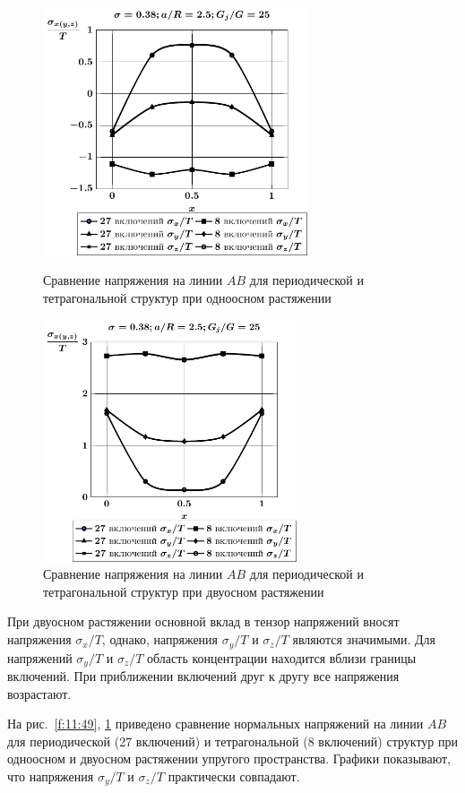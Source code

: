 \begin{figure}[h!]
\centering\footnotesize
\parbox[b]{7.5cm}{\centering\includegraphics[width=7.8cm]{oblate-inc27-8-a25-g25-t1.pdf}
\caption{Сравнение напряжения на линии $AB$ для периодической и тетрагональной структур при одноосном растяжении
\label{f:11:49}}}\hfil\hfil
\parbox[b]{7.5cm}{\centering\includegraphics[width=7.5cm]{oblate-inc27-8-a25-g25-t2.pdf}
\caption{Сравнение напряжения на линии $AB$ для периодической и тетрагональной структур при двуосном растяжении
\label{f:11:50}}}
\end{figure}

При двуосном растяжении основной вклад в тензор напряжений вносят напряжения $\sigma_x/T$, однако, напряжения $\sigma_y/T$ и $\sigma_z/T$ являются значимыми. Для напряжений $\sigma_y/T$ и $\sigma_z/T$ область концентрации находится вблизи границы включений. При приближении включений друг к другу все напряжения возрастают.

На рис.~\ref{f:11:49}, \ref{f:11:50} приведено сравнение нормальных напряжений на линии $AB$ для периодической (27 включений) и тетрагональной (8 включений) структур при одноосном и двуосном растяжении упругого пространства. Графики показывают, что напряжения $\sigma_y/T$ и $\sigma_z/T$ практически совпадают.


